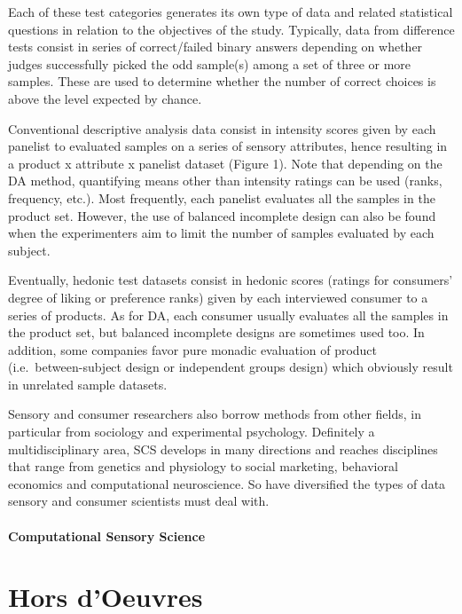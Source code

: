 \documentclass[
]{book}
\begin{document}
Each of these test categories generates its own type of data and related statistical questions in relation to the objectives of the study. Typically, data from difference tests consist in series of correct/failed binary answers depending on whether judges successfully picked the odd sample(s) among a set of three or more samples. These are used to determine whether the number of correct choices is above the level expected by chance.

Conventional descriptive analysis data consist in intensity scores given by each panelist to evaluated samples on a series of sensory attributes, hence resulting in a product x attribute x panelist dataset (Figure 1). Note that depending on the DA method, quantifying means other than intensity ratings can be used (ranks, frequency, etc.). Most frequently, each panelist evaluates all the samples in the product set. However, the use of balanced incomplete design can also be found when the experimenters aim to limit the number of samples evaluated by each subject.

Eventually, hedonic test datasets consist in hedonic scores (ratings for consumers' degree of liking or preference ranks) given by each interviewed consumer to a series of products. As for DA, each consumer usually evaluates all the samples in the product set, but balanced incomplete designs are sometimes used too. In addition, some companies favor pure monadic evaluation of product (i.e.~between-subject design or independent groups design) which obviously result in unrelated sample datasets.

Sensory and consumer researchers also borrow methods from other fields, in particular from sociology and experimental psychology. Definitely a multidisciplinary area, SCS develops in many directions and reaches disciplines that range from genetics and physiology to social marketing, behavioral economics and computational neuroscience. So have diversified the types of data sensory and consumer scientists must deal with.

\hypertarget{computational-sensory-science}{%
\subsection*{Computational Sensory Science}\label{computational-sensory-science}}

\hypertarget{part-hors-doeuvres}{%
\part*{Hors d'Oeuvres}\label{part-hors-doeuvres}}
\end{document}

